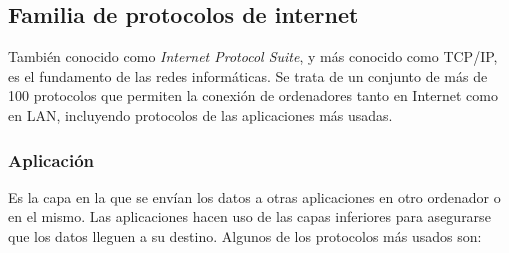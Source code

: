 \documentclass[a4paper, 11pt]{report} %
\begin{document}
\subsection{Familia de protocolos de internet}
También conocido como \textit{Internet Protocol Suite}, y más conocido como TCP/IP, es el fundamento de las redes informáticas. Se trata de un conjunto de más de 100 protocolos que permiten la conexión de ordenadores tanto en Internet como en LAN, incluyendo protocolos de las aplicaciones más usadas.

\setcounter{secnumdepth}{5}
\subsubsection{Aplicación}
Es la capa en la que se envían los datos a otras aplicaciones en otro ordenador o en el mismo. Las aplicaciones hacen uso de las capas inferiores para asegurarse que los datos lleguen a su destino. Algunos de los protocolos más usados son:
\end{document}
